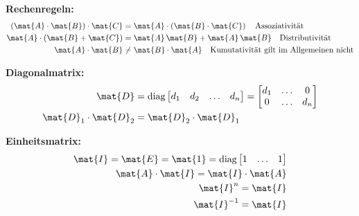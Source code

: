 \textbf{Rechenregeln:}
\begin{align*}
\left(\mat{A}\cdot \mat{B}\right)\cdot \mat{C} &= \mat{A} \cdot \left(\mat{B} \cdot \mat{C}\right) \quad \text{Assoziativität}\\
\mat{A} \cdot \left(\mat{B} + \mat{C}\right) &= \mat{A}\,\mat{B} + \mat{A}\,\mat{B} \quad \text{Distributivität}\\
\mat{A} \cdot \mat{B} &\neq \mat{B} \cdot \mat{A} \quad \text{Kumutativität gilt im Allgemeinen nicht}
\end{align*}

\textbf{Diagonalmatrix:}
\begin{align*}
\mat{D} &= \text{diag}\begin{bmatrix}d_1 & d_2 & \ldots & d_n\end{bmatrix} = \begin{bmatrix}d_1 & \ldots & 0 \\ 0 & \ldots & d_n\end{bmatrix}\\
\mat{D}_1 \cdot \mat{D}_2 &= \mat{D}_2 \cdot \mat{D}_1
\end{align*}

\textbf{Einheitsmatrix:}
\begin{align*}
\mat{I} = \mat{E} = \mat{1} = \text{diag}\begin{bmatrix}1 & \ldots & 1\end{bmatrix}\\
\mat{A} \cdot \mat{I} = \mat{I} \cdot \mat{A}\\
\mat{I}^n = \mat{I}\\
\mat{I}^{-1} = \mat{I}
\end{align*}
